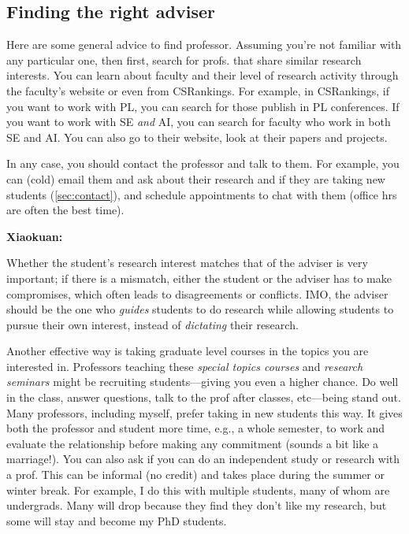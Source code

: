 \documentclass[oneside,11pt]{memoir}
\newenvironment{commentbox}[1][]{
  \small
  \begin{mybox}
    {\small \textbf{#1}}
  }{
  \end{mybox}
}
\begin{document}
\subsection{Finding the right adviser}

Here are some general advice to find professor.  Assuming you're not familiar with any particular one, then first, search for profs. that share similar research interests. You can learn about faculty and their level of research activity through the faculty's website or even from CSRankings.  For example, in CSRankings, if you want to work with PL, you can search for those publish in PL conferences.  If you want to work with SE \emph{and} AI, you can search for faculty who work in both SE and AI.   You can also go to their website, look at their papers and projects.  

In any case, you should contact the professor and talk to them. For example, you can (cold) email them and ask about their research and if they are taking new students (\autoref{sec:contact}), and schedule appointments to chat with them (office hrs are often the best time).

\begin{commentbox}[Xiaokuan:]
  Whether the student's research interest matches that of the adviser is very important;
  if there is a mismatch,
  either the student or the adviser has to make compromises,
  which often leads to disagreements or conflicts.
  IMO, the adviser should be the one who \emph{guides}  students to do research while allowing students to pursue their own interest,
  instead of \emph{dictating} their research.
\end{commentbox}


Another effective way is taking graduate level courses in the topics you are interested in.  Professors teaching these \emph{special topics courses} and \emph{research seminars} might be recruiting students---giving you even a higher chance. Do well in the class, answer questions, talk to the prof after classes, etc---being stand out.  Many professors, including myself, prefer taking in new students this way.  It gives both the professor and student more time, e.g., a whole semester, to work and evaluate the relationship before making any commitment (sounds a bit like a marriage!).
You can also ask if you can do an independent study or research with a prof. This can be informal (no credit) and takes place during the summer or winter break.  For example, I do this with multiple students, many of whom are undergrads. Many will drop because they find they don't like my research, but some will stay and become my PhD students.
\end{document}

